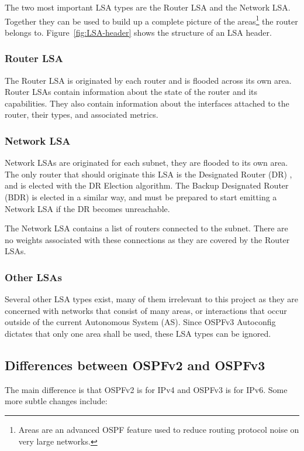 The two most important LSA types are the Router LSA and the Network LSA\@.
Together they can be used to build up a complete picture of the
areas\footnote{Areas are an advanced OSPF feature used to reduce routing
protocol noise on very large networks.} the router belongs to.
Figure~\ref{fig:LSA-header} shows the structure of an LSA header. 

\subsubsection{Router LSA}
The Router LSA is originated by each router and is flooded across its own area.
Router LSAs contain information about the state of the router and its
capabilities. They also contain information about the interfaces attached to
the router, their types, and associated metrics.

\subsubsection{Network LSA}
Network LSAs are originated for each subnet, they are flooded to its own
area.  The only router that should originate this LSA is the Designated Router
(DR) , and is elected with the DR Election
algorithm. The Backup Designated Router (BDR)  is elected in a similar way, and must be prepared to start
emitting a Network LSA if the DR becomes unreachable. 

The Network LSA contains a list of routers connected to the subnet. There are no
weights associated with these connections as they are covered by the Router
LSAs. 

\subsubsection{Other LSAs}
Several other LSA types exist, many of them irrelevant to this project as they
are concerned with networks that consist of many areas, or interactions that
occur outside of the current Autonomous System (AS). Since OSPFv3 Autoconfig
dictates that only one area shall be used, these LSA types can be ignored.   

\subsection{Differences between OSPFv2 and OSPFv3}
The main difference is that OSPFv2 is for IPv4 and OSPFv3 is for IPv6. Some
more subtle changes include:

